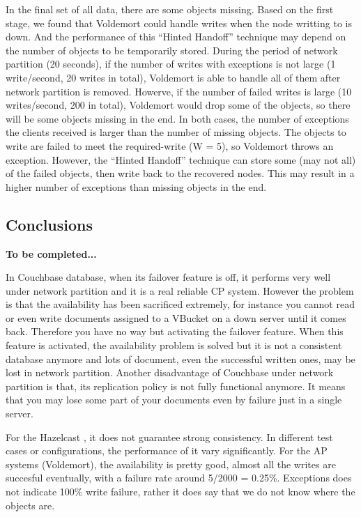 \documentclass[a4paper]{article}
\begin{document}
In the final set of all data, there are some objects missing. Based on the first stage, we found that Voldemort could handle writes when the node writting to is down. 
And the performance of this ``Hinted Handoff'' technique may depend on the number of objects to be temporarily stored. During the period of network partition (20 seconds), 
if the number of writes with exceptions is not large (1 write/second, 20 writes in total), Voldemort is able to handle all of them after network partition is removed. 
Howerve, if the number of failed writes is large (10 writes/second, 200 in total), Voldemort would drop some of the objects, so there will be some objects missing in the end. 
In both cases, the number of exceptions the clients received is larger than the number of missing objects. The objects to write are failed to meet
the required-write (W = 5), so Voldemort throws an exception. However, the ``Hinted Handoff'' technique can store some (may not all) of the failed objects, then write back to
the recovered nodes. This may result in a higher number of exceptions than missing objects in the end.

\subsection{Conclusions}

{\bf To be completed...}

In Couchbase database, when its failover feature is off, it performs very well under network partition and it is a real reliable CP system.
However the problem is that the availability has been sacrificed extremely, for instance you cannot read or even write documents assigned to a VBucket on a down server until it comes back.
Therefore you have no way but activating the failover feature. 
When this feature is activated, the availability problem is solved but it is not a consistent database anymore and lots of document, even the successful written ones, may be lost in network partition. 
Another disadvantage of Couchbase under network partition is that, its replication policy is not fully functional anymore.
It means that you may lose some part of your documents even by failure just in a single server.

For the Hazelcast , it does not guarantee strong consistency. In different test cases or configurations, the performance of it
vary significantly.
For the AP systems (Voldemort), the availability is pretty good, almost all the writes are succesful eventually, with a failure rate around 5/2000 = 0.25\%.
Exceptions does not indicate 100\% write failure, rather it does say that we do not know where the objects are.
\end{document}
